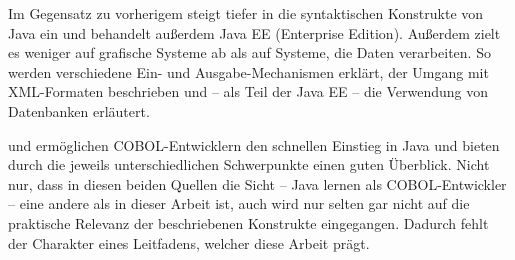 Im Gegensatz zu vorherigem steigt  tiefer in die syntaktischen Konstrukte von Java ein und behandelt außerdem Java EE (Enterprise Edition). Außerdem zielt es weniger auf grafische Systeme ab als auf Systeme, die Daten verarbeiten. So werden verschiedene Ein- und Ausgabe-Mechanismen erklärt, der Umgang mit XML-Formaten beschrieben und -- als Teil der Java EE -- die Verwendung von Datenbanken erläutert.

 und  ermöglichen COBOL-Entwicklern den schnellen Einstieg in Java und bieten durch die jeweils unterschiedlichen Schwerpunkte einen guten Überblick. Nicht nur, dass in diesen beiden Quellen die Sicht -- Java lernen als COBOL-Entwickler -- eine andere als in dieser Arbeit ist, auch wird nur selten \bzw gar nicht auf die praktische Relevanz der beschriebenen Konstrukte eingegangen. Dadurch fehlt der Charakter eines Leitfadens, welcher diese Arbeit prägt. 